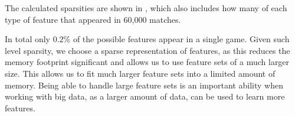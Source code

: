   \begin{table}[!htb]
    \centering
    \caption{The sparsity of each type of feature}\label{tab:featuresparsity}
  \end{table}

The calculated sparsities are shown in , which also includes how many of each type of feature that appeared in 60,000 matches.

In total only $0.2\%$ of the possible features appear in a single game. Given such level sparsity, we choose a sparse representation of features, as this reduces the memory footprint significant and allows us to use feature sets of a much larger size. This allows us to fit much larger feature sets into a limited amount of memory. Being able to handle large feature sets is an important ability when working with big data, as a larger amount of data, can be used to learn more features.
